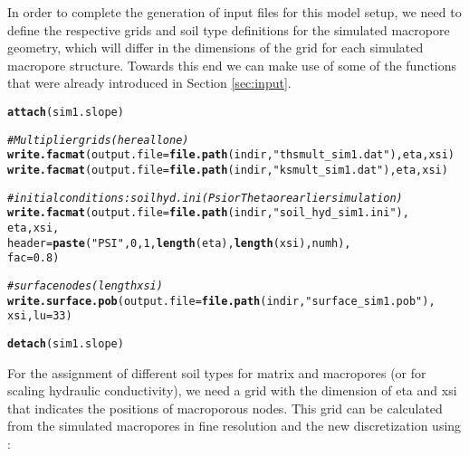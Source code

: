 \documentclass[article,nojss]{jss}\usepackage[]{graphicx}\usepackage[]{xcolor}
\makeatletter
\newcommand{\hlnum}[1]{\textcolor[rgb]{0.686,0.059,0.569}{#1}}%
\newcommand{\hlsng}[1]{\textcolor[rgb]{0.192,0.494,0.8}{#1}}%
\newcommand{\hlcom}[1]{\textcolor[rgb]{0.678,0.584,0.686}{\textit{#1}}}%
\newcommand{\hldef}[1]{\textcolor[rgb]{0.345,0.345,0.345}{#1}}%
\newcommand{\hlkwc}[1]{\textcolor[rgb]{0.333,0.667,0.333}{#1}}%
\newcommand{\hlkwd}[1]{\textcolor[rgb]{0.737,0.353,0.396}{\textbf{#1}}}%
\newenvironment{kframe}{%
 \def\at@end@of@kframe{}%
 \ifinner\ifhmode%
  \def\at@end@of@kframe{\end{minipage}}%
  \begin{minipage}{\columnwidth}%
 \fi\fi%
 \def\FrameCommand##1{\hskip\@totalleftmargin \hskip-\fboxsep
 \colorbox{shadecolor}{##1}\hskip-\fboxsep
     \hskip-\linewidth \hskip-\@totalleftmargin \hskip\columnwidth}%
 \MakeFramed {\advance\hsize-\width
   \@totalleftmargin\z@ \linewidth\hsize
   \@setminipage}}%
 {\par\unskip\endMakeFramed%
 \at@end@of@kframe}
\newenvironment{knitrout}{}{} %
\makeatother
\begin{document}
In order to complete the generation of input files for this model setup, we need to define
the respective grids and soil type definitions for the simulated macropore geometry, which
will differ in the dimensions of the grid for each simulated macropore structure.
Towards this end we can make use of some of the functions that were already introduced in 
Section \ref{sec:input}.
\begin{knitrout}
\color{fgcolor}\begin{kframe}
\begin{alltt}
  \hlkwd{attach}\hldef{(sim1.slope)}

  \hlcom{# Multiplier grids (here all one)}
  \hlkwd{write.facmat}\hldef{(}\hlkwc{output.file}\hldef{=}\hlkwd{file.path}\hldef{(indir,}\hlsng{"thsmult_sim1.dat"}\hldef{), eta, xsi)}
  \hlkwd{write.facmat}\hldef{(}\hlkwc{output.file}\hldef{=}\hlkwd{file.path}\hldef{(indir,}\hlsng{"ksmult_sim1.dat"}\hldef{), eta, xsi)}

  \hlcom{# initial conditions: soilhyd.ini (Psi or Theta or earlier simulation)}
  \hlkwd{write.facmat}\hldef{(}\hlkwc{output.file}\hldef{=}\hlkwd{file.path}\hldef{(indir,}\hlsng{"soil_hyd_sim1.ini"}\hldef{),}
               \hldef{eta, xsi,}
               \hlkwc{header}\hldef{=}\hlkwd{paste}\hldef{(}\hlsng{"PSI   "}\hldef{,} \hlnum{0}\hldef{,}  \hlnum{1}\hldef{,} \hlkwd{length}\hldef{(eta),} \hlkwd{length}\hldef{(xsi), numh),}
               \hlkwc{fac} \hldef{=} \hlnum{0.8}\hldef{)}

  \hlcom{# surface nodes (length xsi)}
    \hlkwd{write.surface.pob}\hldef{(}\hlkwc{output.file}\hldef{=}\hlkwd{file.path}\hldef{(indir,}\hlsng{"surface_sim1.pob"}\hldef{),}
                      \hldef{xsi,} \hlkwc{lu}\hldef{=}\hlnum{33}\hldef{)}

  \hlkwd{detach}\hldef{(sim1.slope)}
\end{alltt}
\end{kframe}
\end{knitrout}


For the assignment of different soil types for matrix and macropores (or for scaling 
hydraulic conductivity), we need a grid with the dimension of eta and xsi that indicates the
positions of macroporous nodes. This grid can be calculated from the simulated macropores in fine resolution and the new discretization using :
\end{document}
